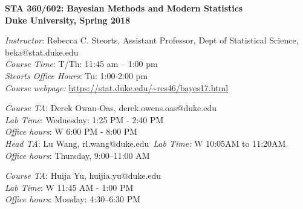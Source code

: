 \documentclass[11pt]{article}
\date{}
\begin{document}

\begin{center}
{\Large\bf STA 360/602: Bayesian Methods and Modern Statistics} \\

{\Large\bf Duke University, Spring 2018} \\
\end{center}

\emph{Instructor}: Rebecca C. Steorts,  Assistant Professor, Dept of Statistical Science, beka@stat.duke.edu\\
\emph{Course Time}: T/Th: 11:45 am -- 1:00 pm\\
\emph{Steorts Office Hours}: Tu: 1:00-2:00 pm \\
\emph{Course webpage:} \url{https://stat.duke.edu/~rcs46/bayes17.html} \\
\vspace*{1em}

\emph{Course TA}: Derek Owan-Oas, derek.owens.oas@duke.edu \\
\emph{Lab Time}: Wednesday: 1:25 PM - 2:40 PM \\
\emph{Office hours}: W 6:00 PM - 8:00 PM \\

\emph{Head TA}:  Lu Wang, rl.wang@duke.edu\
\emph{Lab Time:} W 10:05AM to 11:20AM.\\
\emph{Office hours}:  Thursday, 9:00--11:00 AM
\vspace*{1em}

\emph{Course TA}: Huija Yu, huijia.yu@duke.edu \\
\emph{Lab Time}: W 11:45 AM - 1:00 PM\\
\emph{Office hours}: Monday: 4:30--6:30 PM  \\


\end{document}
